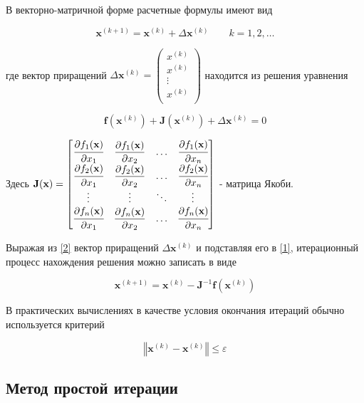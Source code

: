 В векторно-матричной форме расчетные формулы имеют вид


\begin{equation}
    \label{1}
    \textbf{x}^{(k+1)} = \textbf{x}^{(k)} + \Delta \textbf{x}^{(k)}
    \qquad k=1,2,\dots
\end{equation}

где вектор приращений
$\Delta\textbf{x}^{(k)} = \begin{pmatrix}
    x^{(k)} \\
    x^{(k)} \\
    \vdots \\
    x^{(k)} \\
\end{pmatrix}$
находится из решения уравнения

\begin{equation}
    \label{2}
    \textbf{f}(\textbf{x}^{(k)}) + \textbf{J}(\textbf{x}^{(k)})
+ \Delta \textbf{x}^{(k)} = 0\end{equation}

Здесь $\textbf{J}(\textbf{x}) = \begin{bmatrix}
    \cfrac{\partial f_1(\textbf{x})}{\partial x_1} &
    \dfrac{\partial f_1(\textbf{x})}{\partial x_2} & \hdots &
    \cfrac{\partial f_1(\textbf{x})}{\partial x_n} \\
    \cfrac{\partial f_2(\textbf{x})}{\partial x_1} &
    \dfrac{\partial f_2(\textbf{x})}{\partial x_2} & \hdots &
    \cfrac{\partial f_2(\textbf{x})}{\partial x_n} \\
    \vdots & \vdots & \ddots & \vdots \\
    \cfrac{\partial f_n(\textbf{x})}{\partial x_1} &
    \dfrac{\partial f_n(\textbf{x})}{\partial x_2} & \hdots &
    \cfrac{\partial f_n(\textbf{x})}{\partial x_n} \\
\end{bmatrix}$ - матрица Якоби.

Выражая из \eqref{2} вектор приращений $\Delta\textbf{x}^{(k)}$
и подставляя его в \eqref{1},
итерационный процесс нахождения решения можно записать в виде

$$\textbf{x}^{(k+1)}=\textbf{x}^{(k)}-\textbf{J}^{-1}\textbf{f}\left(\textbf{x}^{(k)}\right)$$

В практических вычислениях в качестве условия окончания итераций обычно
используется критерий

$$\left\Vert\textbf{x}^{(k)} - \textbf{x}^{(k)}\right\Vert \leqslant \varepsilon$$

\subsection*{Метод простой итерации}

